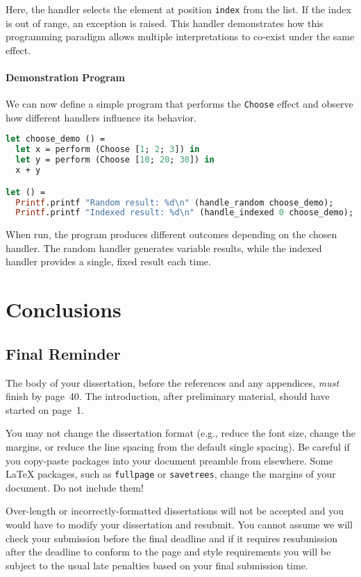 \documentclass[logo,bsc,singlespacing,parskip,online]{infthesis}
\begin{document}
Here, the handler selects the element at position \texttt{index} from the list. If the index is out of range, an exception is raised. This handler demonstrates how this programming paradigm allows multiple interpretations to co-exist under the same effect.

\subsubsection{Demonstration Program}

We can now define a simple program that performs the \texttt{Choose} effect and observe how different handlers influence its behavior.

\begin{lstlisting}[language=OCaml]
let choose_demo () =
  let x = perform (Choose [1; 2; 3]) in
  let y = perform (Choose [10; 20; 30]) in
  x + y

let () =
  Printf.printf "Random result: %d\n" (handle_random choose_demo);
  Printf.printf "Indexed result: %d\n" (handle_indexed 0 choose_demo);
\end{lstlisting}

When run, the program produces different outcomes depending on the chosen handler. The random handler generates variable results, while the indexed handler provides a single, fixed result each time.

\chapter{Conclusions}

\section{Final Reminder}

The body of your dissertation, before the references and any appendices,
\emph{must} finish by page~40. The introduction, after preliminary material,
should have started on page~1.

You may not change the dissertation format (e.g., reduce the font size, change
the margins, or reduce the line spacing from the default single spacing). Be
careful if you copy-paste packages into your document preamble from elsewhere.
Some \LaTeX{} packages, such as \texttt{fullpage} or \texttt{savetrees}, change
the margins of your document. Do not include them!

Over-length or incorrectly-formatted dissertations will not be accepted and you
would have to modify your dissertation and resubmit. You cannot assume we will
check your submission before the final deadline and if it requires resubmission
after the deadline to conform to the page and style requirements you will be
subject to the usual late penalties based on your final submission time.
\end{document}
